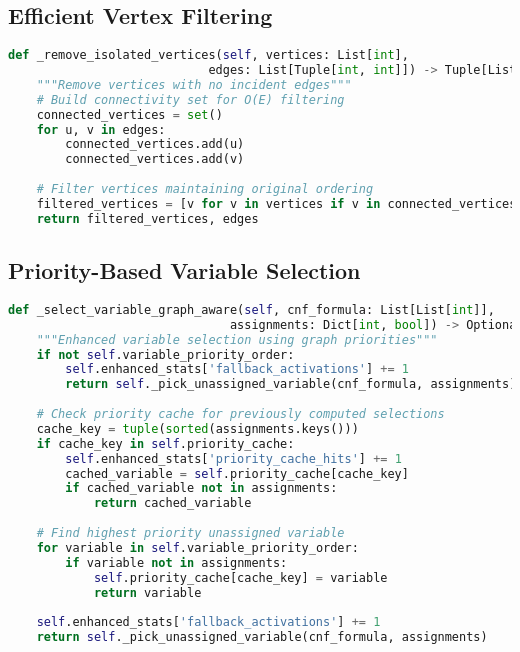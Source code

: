 \subsection{Efficient Vertex Filtering}
\label{appendix:vertex-filtering}

\begin{lstlisting}[language=Python, caption=Efficient Vertex Filtering]
def _remove_isolated_vertices(self, vertices: List[int], 
                            edges: List[Tuple[int, int]]) -> Tuple[List[int], List[Tuple[int, int]]]:
    """Remove vertices with no incident edges"""
    # Build connectivity set for O(E) filtering
    connected_vertices = set()
    for u, v in edges:
        connected_vertices.add(u)
        connected_vertices.add(v)
    
    # Filter vertices maintaining original ordering
    filtered_vertices = [v for v in vertices if v in connected_vertices]
    return filtered_vertices, edges
\end{lstlisting}

\subsection{Priority-Based Variable Selection}
\label{appendix:priority-selection}

\begin{lstlisting}[language=Python, caption=Priority-Based Variable Selection]
def _select_variable_graph_aware(self, cnf_formula: List[List[int]], 
                               assignments: Dict[int, bool]) -> Optional[int]:
    """Enhanced variable selection using graph priorities"""
    if not self.variable_priority_order:
        self.enhanced_stats['fallback_activations'] += 1
        return self._pick_unassigned_variable(cnf_formula, assignments)
    
    # Check priority cache for previously computed selections
    cache_key = tuple(sorted(assignments.keys()))
    if cache_key in self.priority_cache:
        self.enhanced_stats['priority_cache_hits'] += 1
        cached_variable = self.priority_cache[cache_key]
        if cached_variable not in assignments:
            return cached_variable
    
    # Find highest priority unassigned variable
    for variable in self.variable_priority_order:
        if variable not in assignments:
            self.priority_cache[cache_key] = variable
            return variable
    
    self.enhanced_stats['fallback_activations'] += 1
    return self._pick_unassigned_variable(cnf_formula, assignments)
\end{lstlisting}


